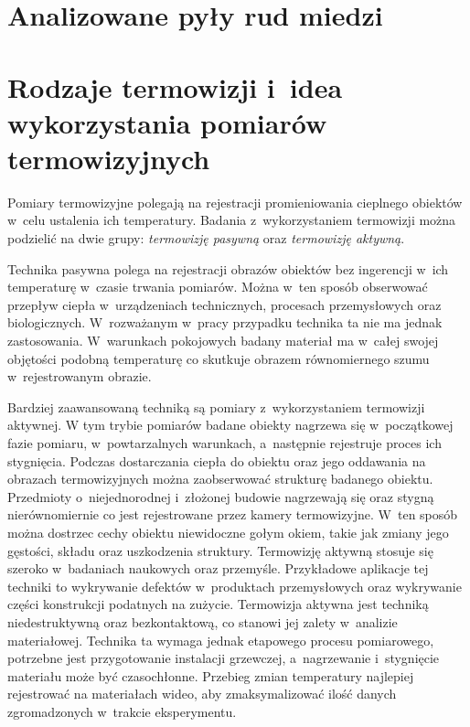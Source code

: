 \section{Analizowane pyły rud miedzi} \label{sec:grains}

\section{Rodzaje termowizji i~idea wykorzystania pomiarów termowizyjnych}
\label{sec:thermovision}
Pomiary termowizyjne polegają na rejestracji promieniowania cieplnego obiektów
w~celu ustalenia ich temperatury.
Badania z~wykorzystaniem termowizji można podzielić na dwie grupy:
\emph{termowizję pasywną} oraz \emph{termowizję aktywną}.

Technika pasywna polega na rejestracji obrazów obiektów bez ingerencji w~ich
temperaturę w~czasie trwania pomiarów.
Można w~ten sposób obserwować przepływ ciepła w~urządzeniach technicznych,
procesach przemysłowych oraz biologicznych.
W~rozważanym w~pracy przypadku technika ta nie ma jednak zastosowania.
W~warunkach pokojowych badany materiał ma w~całej swojej objętości podobną
temperaturę co skutkuje obrazem równomiernego szumu w~rejestrowanym obrazie.

Bardziej zaawansowaną techniką są pomiary z~wykorzystaniem termowizji
aktywnej.
W tym trybie pomiarów badane obiekty nagrzewa się w~początkowej fazie pomiaru,
w~powtarzalnych warunkach, a~następnie rejestruje proces ich stygnięcia.
Podczas dostarczania ciepła do obiektu oraz jego oddawania na obrazach
termowizyjnych można zaobserwować strukturę badanego obiektu.
Przedmioty o~niejednorodnej i~złożonej budowie nagrzewają się oraz stygną
nierównomiernie co jest rejestrowane przez kamery termowizyjne.
W~ten sposób można dostrzec cechy obiektu niewidoczne gołym okiem, takie
jak zmiany jego gęstości, składu oraz uszkodzenia struktury.
Termowizję aktywną stosuje się szeroko w~badaniach naukowych oraz przemyśle.
Przykładowe aplikacje tej techniki to wykrywanie defektów w~produktach
przemysłowych oraz wykrywanie części konstrukcji podatnych na zużycie.
Termowizja aktywna jest techniką niedestruktywną oraz bezkontaktową,
co stanowi jej zalety w~analizie materiałowej.
Technika ta wymaga jednak etapowego procesu pomiarowego, potrzebne jest 
przygotowanie instalacji grzewczej, a~nagrzewanie i~stygnięcie materiału
może być czasochłonne.
Przebieg zmian temperatury najlepiej rejestrować na materiałach wideo,
aby zmaksymalizować ilość danych zgromadzonych w~trakcie eksperymentu.

